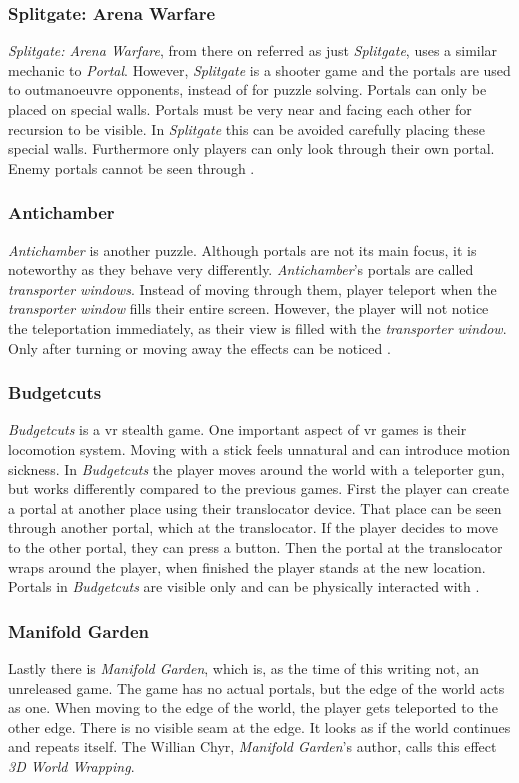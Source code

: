 \subsubsection{Splitgate: Arena Warfare}
\textit{Splitgate: Arena Warfare}, from there on referred as just \textit{Splitgate}, uses a similar mechanic to \textit{Portal}. However, \textit{Splitgate} is a shooter game and the portals are used to outmanoeuvre opponents, instead of for puzzle solving. Portals can only be placed on special walls. Portals must be very near and facing each other for recursion to be visible. In \textit{Splitgate} this can be avoided carefully placing these special walls. Furthermore only players can only look through their own portal. Enemy portals cannot be seen through \cite{splitgate}.

\subsubsection{Antichamber}
\textit{Antichamber} is another puzzle. Although portals are not its main focus, it is noteworthy as they behave very differently. \textit{Antichamber}'s portals are called \textit{transporter windows}. Instead of moving through them, player teleport when the \textit{transporter window} fills their entire screen. However, the player will not notice the teleportation immediately, as their view is filled with the \textit{transporter window}. Only after turning or moving away the effects can be noticed \cite{antichamber}.

\subsubsection{Budgetcuts}
\textit{Budgetcuts} is a \gls{vr} stealth game. One important aspect of \gls{vr} games is their locomotion system. Moving with a stick feels unnatural and can introduce motion sickness. In \textit{Budgetcuts} the player moves around the world with a teleporter gun, but works differently compared to the previous games. First the player can create a portal at another place using their translocator device. That place can be seen through another portal, which at the translocator. If the player decides to move to the other portal, they can press a button. Then the portal at the translocator wraps around the player, when finished the player stands at the new location. Portals in \textit{Budgetcuts} are visible only and can be physically interacted with \cite{budgetcuts, gdc:budgetcuts}.

\subsubsection{Manifold Garden}
Lastly there is \textit{Manifold Garden}, which is, as the time of this writing not, an unreleased game. The game has no actual portals, but the edge of the world acts as one. When moving to the edge of the world, the player gets teleported to the other edge. There is no visible seam at the edge. It looks as if the world continues and repeats itself. The Willian Chyr, \textit{Manifold Garden}'s author, calls this effect \textit{3D World Wrapping}.

